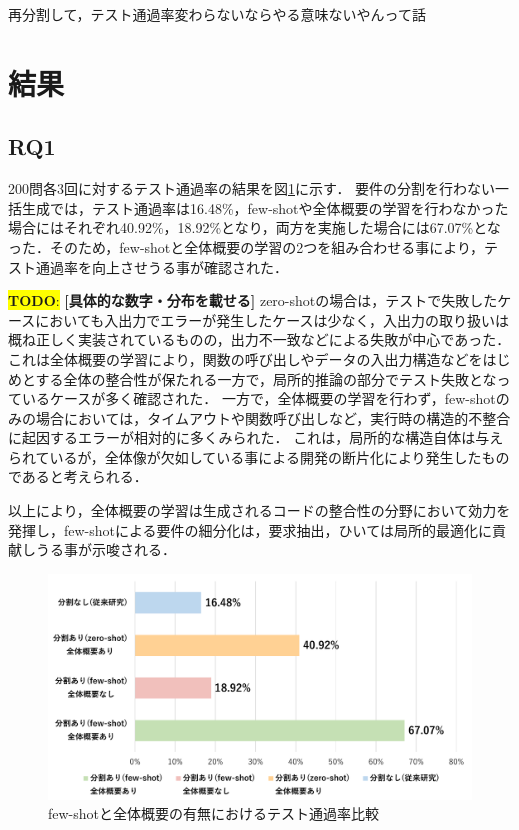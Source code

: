 \documentclass[submit,techrep,noauthor]{ipsj}
\newcommand{\todo}[1]{\colorbox{yellow}{{\bf TODO}:}{\color{red} {\textbf{[#1]}}}}
\begin{document}
再分割して，テスト通過率変わらないならやる意味ないやんって話

\section{結果}
\label{sec:result}

\subsection{RQ1}
200問各3回に対するテスト通過率の結果を図\ref{ses2025}に示す．
要件の分割を行わない一括生成では，テスト通過率は16.48\%，few-shotや全体概要の学習を行わなかった場合にはそれぞれ40.92\%，18.92\%となり，両方を実施した場合には67.07\%となった．そのため，few-shotと全体概要の学習の2つを組み合わせる事により，テスト通過率を向上させうる事が確認された．

\todo{具体的な数字・分布を載せる}
zero-shotの場合は，テストで失敗したケースにおいても入出力でエラーが発生したケースは少なく，入出力の取り扱いは概ね正しく実装されているものの，出力不一致などによる失敗が中心であった．
これは全体概要の学習により，関数の呼び出しやデータの入出力構造などをはじめとする全体の整合性が保たれる一方で，局所的推論の部分でテスト失敗となっているケースが多く確認された．
一方で，全体概要の学習を行わず，few-shotのみの場合においては，タイムアウトや関数呼び出しなど，実行時の構造的不整合に起因するエラーが相対的に多くみられた．
これは，局所的な構造自体は与えられているが，全体像が欠如している事による開発の断片化により発生したものであると考えられる．

以上により，全体概要の学習は生成されるコードの整合性の分野において効力を発揮し，few-shotによる要件の細分化は，要求抽出，ひいては局所的最適化に貢献しうる事が示唆される．


\begin{figure}[t]
    \centering
    \includegraphics[width=1.0\linewidth]{./Toyoshima_fig/SIGSE_fig1.pdf}
    \caption{few-shotと全体概要の有無におけるテスト通過率比較}
    \label{ses2025}
\end{figure}
\end{document}
